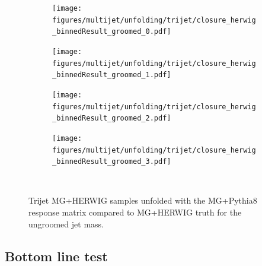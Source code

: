       \begin{figure}[htp!]
        \begin{subfigure}
          \centering
          \texttt{[image: figures/multijet/unfolding/trijet/closure\_herwig\_binnedResult\_groomed\_0.pdf]}
        \end{subfigure} 
        \begin{subfigure}
          \centering
          \texttt{[image: figures/multijet/unfolding/trijet/closure\_herwig\_binnedResult\_groomed\_1.pdf]}
        \end{subfigure}
        \begin{subfigure}
          \centering
          \texttt{[image: figures/multijet/unfolding/trijet/closure\_herwig\_binnedResult\_groomed\_2.pdf]}
        \end{subfigure} 
        \begin{subfigure}
          \centering
          \texttt{[image: figures/multijet/unfolding/trijet/closure\_herwig\_binnedResult\_groomed\_3.pdf]}
        \end{subfigure} \\
	\caption{Trijet MG+HERWIG samples unfolded with the MG+Pythia8 response matrix compared to MG+HERWIG truth for the ungroomed jet mass.}
	\label{fig:trijetherwigclosurebinned_g}
      \end{figure}

      \subsection{Bottom line test}
      
